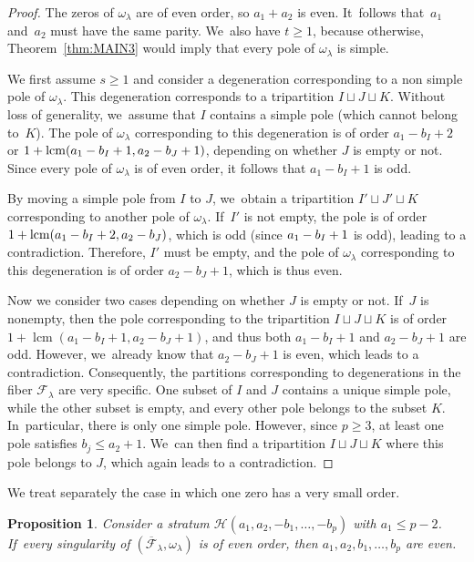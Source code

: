 \documentclass[11pt]{article}
\DeclareMathOperator{\lcm}{lcm}
\newtheorem{prop}[thm]{Proposition}
\theoremstyle{definition}
\begin{document}
\begin{proof}
The zeros of $\omega_{\lambda}$ are of even order, so $a_{1}+a_{2}$ is even. It~follows that~$a_{1}$ and~$a_{2}$ must have the same parity. We~also have $t \geq 1$, because otherwise, Theorem~\ref{thm:MAIN3} would imply that every pole of $\omega_{\lambda}$ is simple.

We first assume $s \geq 1$ and consider a degeneration corresponding to a non simple pole of $\omega_{\lambda}$. This degeneration corresponds to a tripartition $I \sqcup J \sqcup K$. Without loss of generality, we~assume that $I$ contains a simple pole (which cannot belong to~$K$). The pole of $\omega_{\lambda}$ corresponding to this degeneration is of order $a_{1}-b_{I}+2$ or $1+\nobreak \lcm(a_{1}-\nobreak b_{I}+\nobreak 1,a_{2}-b_{J}+1)$, depending on whether $J$ is empty or not. Since every pole of $\omega_{\lambda}$ is of even order, it follows that $a_{1}-b_{I}+1$ is odd.

By moving a simple pole from $I$ to $J$, we~obtain a tripartition $I' \sqcup J' \sqcup K$ corresponding to another pole of $\omega_{\lambda}$. If~$I'$ is not empty, the pole is of order $1+\nobreak \lcm(a_{1}-\nobreak b_{I}+\nobreak 2,a_{2}-\nobreak b_{J})$, which is odd (since $a_{1}-\nobreak b_{I}+1$ is odd), leading to a contradiction. Therefore, $I'$ must be empty, and the pole of $\omega_{\lambda}$ corresponding to this degeneration is of order $a_{2}-b_{J}+1$, which is thus even.

Now we consider two cases depending on whether $J$ is empty or not. If~$J$ is nonempty, then the pole corresponding to the tripartition $I \sqcup J \sqcup K$ is of order $1+\lcm(a_{1}-b_{I}+1,a_{2}-b_{J}+1)$, and thus both $a_{1}-b_{I}+1$ and $a_{2}-b_{J}+1$ are odd. However, we~already know that $a_{2}-b_{J}+1$ is even, which leads to a contradiction. Consequently, the partitions corresponding to degenerations in the fiber $\mathcal{F}_{\lambda}$ are very specific. One subset of $I$ and $J$ contains a unique simple pole, while the other subset is empty, and every other pole belongs to the subset $K$. In~particular, there is only one simple pole. However, since $p \geq 3$, at least one pole satisfies $b_{j} \leq a_{2}+1$. We~can then find a tripartition $I \sqcup J \sqcup K$ where this pole belongs to $J$, which again leads to a contradiction.
\end{proof}

We treat separately the case in which one zero has a very small order.

\begin{prop}\label{prop:EvenEven1}
Consider a stratum $\mathcal{H}(a_{1},a_{2},-b_{1},\dots,-b_{p})$ with $a_{1} \leq p-2$. If~every singularity of $(\overline{\mathcal{F}}_{\lambda},\omega_{\lambda})$ is of even order, then $a_{1},a_{2},b_{1},\dots,b_{p}$ are even.
\end{prop}
\end{document}
